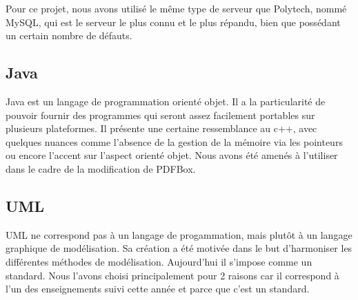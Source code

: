 Pour ce projet, nous avons utilisé le même type de serveur que Polytech, nommé MySQL, qui est le serveur le plus connu
et le plus répandu, bien que possédant un certain nombre de défauts.

        \subsection{Java}
Java est un langage de programmation orienté objet. Il a la particularité de pouvoir fournir des 
programmes qui seront assez facilement portables sur plusieurs plateformes. Il présente une certaine
ressemblance au c++, avec quelques nuances comme l'absence de la gestion de la mémoire via les pointeurs
ou encore l'accent sur l'aspect orienté objet.
Nous avons été amenés à l'utiliser dans le cadre de la modification de PDFBox. 

       \subsection{UML}
UML ne correspond pas à un langage de progammation, mais plutôt à un langage graphique de modélisation.
Sa création a été motivée dans le but d'harmoniser les différentes méthodes de modélisation. Aujourd'hui il s'impose comme 
un standard. Nous l'avons choisi principalement pour 2 raisons car il correspond à l'un des enseignements suivi cette année
et parce que c'est un standard.

